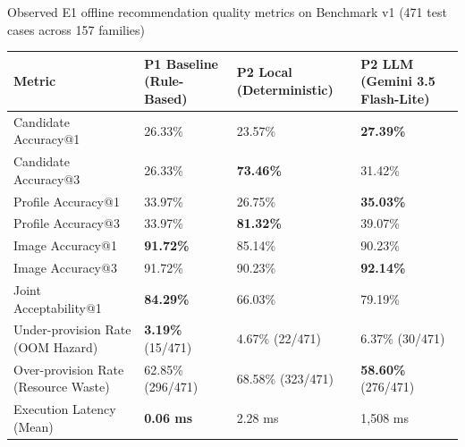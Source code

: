 \begin{table}[ht]{Observed E1 offline recommendation quality metrics on Benchmark v1 (471 test cases across 157 families)}
\label{tab:e1-results}
\centering
\small
\begin{tabular}{p{4.6cm}p{2.5cm}p{2.7cm}p{2.7cm}}
\toprule
Metric & P1 Baseline (Rule-Based) & P2 Local (Deterministic) & P2 LLM (Gemini 3.5 Flash-Lite) \\
\midrule
Candidate Accuracy@1 & 26.33\% & 23.57\% & \textbf{27.39\%} \\
Candidate Accuracy@3 & 26.33\% & \textbf{73.46\%} & 31.42\% \\
Profile Accuracy@1 & 33.97\% & 26.75\% & \textbf{35.03\%} \\
Profile Accuracy@3 & 33.97\% & \textbf{81.32\%} & 39.07\% \\
Image Accuracy@1 & \textbf{91.72\%} & 85.14\% & 90.23\% \\
Image Accuracy@3 & 91.72\% & 90.23\% & \textbf{92.14\%} \\
\addlinespace
Joint Acceptability@1 & \textbf{84.29\%} & 66.03\% & 79.19\% \\
Under-provision Rate (OOM Hazard) & \textbf{3.19\%} (15/471) & 4.67\% (22/471) & 6.37\% (30/471) \\
Over-provision Rate (Resource Waste) & 62.85\% (296/471) & 68.58\% (323/471) & \textbf{58.60\%} (276/471) \\
Execution Latency (Mean) & \textbf{0.06 ms} & 2.28 ms & 1,508 ms \\
\bottomrule
\end{tabular}
\end{table}
